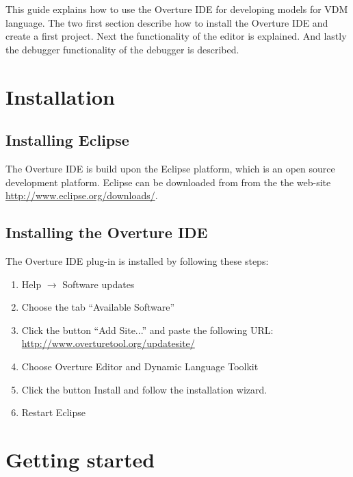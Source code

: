 
This guide explains how to use the Overture IDE for developing models for VDM
language. The two first section describe how to install the Overture IDE and
create a first project. Next the functionality of the editor is explained.
And lastly the debugger functionality of the debugger is described.


\section{Installation}
\subsection{Installing Eclipse}

The Overture IDE is build upon the Eclipse platform, which is an open source
development platform. Eclipse can be downloaded from from the the web-site
\url{http://www.eclipse.org/downloads/}. 

\subsection{Installing the Overture IDE}
\label{sec:userguide:InstallOverturePlugin}

The Overture IDE plug-in is installed by following these steps:
\begin{enumerate}
	\item Help $\rightarrow$ Software updates 
	\item Choose the tab ``Available Software'' 
	\item Click the button ``Add Site...'' and paste the following URL:\newline
	\url{http://www.overturetool.org/updatesite/} 
	\item Choose Overture Editor and Dynamic Language Toolkit
	\item Click the button Install and follow the installation wizard.
	\item Restart Eclipse 
\end{enumerate}

\section{Getting started}
\label{sec:userguide:GettingStarted}

